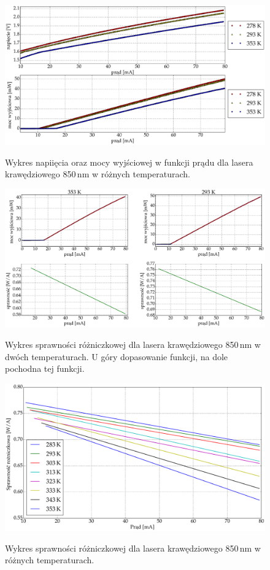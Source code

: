 \begin{figure}
\center
  \includegraphics[scale=0.30]{plot_edge_850/plot_i_v_i_l.eps}
  \label{rys1}
  \caption{Wykres napiięcia oraz mocy wyjściowej w funkcji prądu dla lasera krawędziowego 850\,nm w różnych temperaturach.}
  \label{fig:plot_i_v_i_l_850}
\end{figure}
\begin{figure}
\center
  \includegraphics[scale=0.30]{plot_edge_850/eff_via_current4.eps}
  \label{rys1}
  \caption{Wykres sprawności różniczkowej dla lasera krawędziowego 850\,nm w dwóch temperaturach. U góry dopasowanie funkcji,
  na dole pochodna tej funkcji.}
  \label{fig:eff_via_current4_850}
\end{figure}
\begin{figure}
\center
  \includegraphics[scale=0.30]{plot_edge_850/plot_eff_via_current_all.eps}
  \label{rys1}
  \caption{Wykres sprawności różniczkowej dla lasera krawędziowego 850\,nm w różnych temperaturach.}
  \label{fig:plot_eff_via_current_all_850}
\end{figure}
\newpage